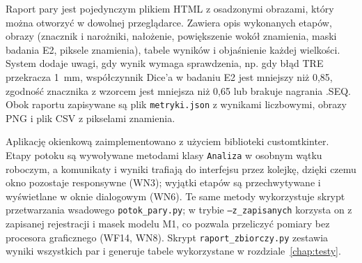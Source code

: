 Raport pary jest pojedynczym plikiem HTML z osadzonymi obrazami, który można otworzyć w dowolnej przeglądarce. Zawiera opis wykonanych etapów, obrazy (znacznik i narożniki, nałożenie, powiększenie wokół znamienia, maski badania E2, piksele znamienia), tabele wyników i objaśnienie każdej wielkości. System dodaje uwagi, gdy wynik wymaga sprawdzenia, np. gdy błąd TRE przekracza 1~mm, współczynnik Dice'a w badaniu E2 jest mniejszy niż 0,85, zgodność znacznika z wzorcem jest mniejsza niż 0,65 lub brakuje nagrania .SEQ. Obok raportu zapisywane są plik \texttt{metryki.json} z wynikami liczbowymi, obrazy PNG i plik CSV z pikselami znamienia.

Aplikację okienkową zaimplementowano z użyciem biblioteki customtkinter. Etapy potoku są wywoływane metodami klasy \texttt{Analiza} w osobnym wątku roboczym, a komunikaty i wyniki trafiają do interfejsu przez kolejkę, dzięki czemu okno pozostaje responsywne (WN3); wyjątki etapów są przechwytywane i wyświetlane w oknie dialogowym (WN6). Te same metody wykorzystuje skrypt przetwarzania wsadowego \texttt{potok\_pary.py}; w trybie \texttt{--z\_zapisanych} korzysta on z zapisanej rejestracji i masek modelu M1, co pozwala przeliczyć pomiary bez procesora graficznego (WF14, WN8). Skrypt \texttt{raport\_zbiorczy.py} zestawia wyniki wszystkich par i generuje tabele wykorzystane w rozdziale~\ref{chap:testy}.
